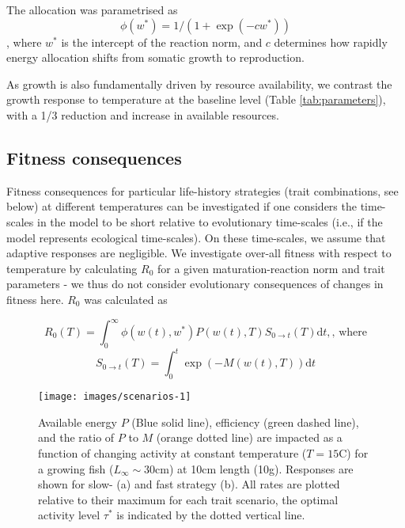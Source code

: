 \documentclass[11pt]{article}\usepackage[]{graphicx}\usepackage[]{color}
\makeatletter
\def\maxwidth{ %
  \ifdim\Gin@nat@width>\linewidth
    \linewidth
  \else
    \Gin@nat@width
  \fi
}
\makeatother
\begin{document}
The allocation was parametrised as 
$$\phi(w^*) = 1/(1+\exp(-cw^*))$$,
where $w^*$ is the intercept of the reaction norm, and $c$ determines how rapidly energy allocation shifts from somatic growth to reproduction. 

As growth is also fundamentally driven by resource availability, we contrast the growth response to temperature at the baseline level (Table \ref{tab:parameters}), with a 1/3 reduction and increase in available resources.

\subsection*{Fitness consequences}

Fitness consequences for particular life-history strategies (trait combinations, see below) at different temperatures can be investigated if one considers the time-scales in the model to be short relative to evolutionary time-scales (i.e., if the model represents ecological time-scales). On these time-scales, we assume that adaptive responses are negligible. We investigate over-all fitness with respect to temperature by calculating $R_0$ for a given maturation-reaction norm and trait parameters - we thus do not consider evolutionary consequences of changes in fitness here. $R_0$ was calculated as 

$$R_0(T) = \int_0^\infty \phi(w(t),w^*)P(w(t),T)S_{0 \rightarrow t}(T) \text{d}t, \text{, where}$$
$$S_{0 \rightarrow t}(T) = \int_0^t \exp(-M(w(t),T))\text{d}t$$








\begin{figure}

{\centering \texttt{[image: images/scenarios-1]} 

}

\caption[Available energy $P$ (Blue solid line), efficiency (green dashed line), and the ratio of $P$ to $M$ (orange dotted line) are impacted as a function of changing activity at constant temperature ($T=15$\degree C) for a growing fish ($L_{\infty}\sim 30$cm) at 10cm length (10g)]{Available energy $P$ (Blue solid line), efficiency (green dashed line), and the ratio of $P$ to $M$ (orange dotted line) are impacted as a function of changing activity at constant temperature ($T=15$\degree C) for a growing fish ($L_{\infty}\sim 30$cm) at 10cm length (10g). Responses are shown for slow- (a) and fast strategy (b). All rates are plotted relative to their maximum for each trait scenario, the optimal activity level $\tau^*$ is indicated by the dotted vertical line.}\label{fig:scenarios}
\end{figure}
\end{document}

